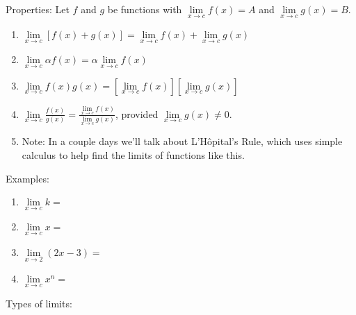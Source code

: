 \documentclass[]{book}
\theoremstyle{definition}
\theoremstyle{definition}
\theoremstyle{definition}
\theoremstyle{remark}
\begin{document}
Properties: Let \(f\) and \(g\) be functions with
\(\lim\limits_{x \to c} f(x)=A\) and \(\lim\limits_{x \to c} g(x)=B\).

\begin{enumerate}
        \item $\lim\limits_{x \to c}[f(x)+g(x)]=\lim\limits_{x \to c} f(x)+ \lim\limits_{x \to c} g(x)$
        \item $\lim\limits_{x \to c} \alpha f(x) = \alpha \lim\limits_{x \to c} f(x)$
        \item $\lim\limits_{x \to c} f(x) g(x) = [\lim\limits_{x \to c} f(x)][\lim\limits_{x \to c} g(x)]$
        \item $\lim\limits_{x \to c} \frac{f(x)}{g(x)} = \frac{\lim\limits_{x \to c} f(x)}{\lim\limits_{x \to c} g(x)}$, provided $\lim\limits_{x \to c} g(x)\ne 0$.
            \item Note: In a couple days we'll talk about L'H\^opital's Rule, which uses simple calculus to help find the limits of functions like this.
\end{enumerate}

Examples:

\begin{enumerate}
\item $\lim\limits_{x \to c} k =$
\item $\lim\limits_{x \to c} x =$

\begin{comment}
        \item \parbox[t]{3.75in}{$\lim\limits_{x\to 0} |x| =$} \parbox[t]{1in}{\,{\texttt{[image: abs.eps]}}} %
        \item \parbox[t]{3.75in}{$\lim\limits_{x\to 0} \left(1+\frac{1}{x^2}\right)=$} \parbox[t]{1in}{\,  {\texttt{[image: 1p1ovrx2.eps]}}} %
\end{comment}
        
\item $\lim\limits_{x\to 2} (2x-3) =$ %
\item $\lim\limits_{x \to c} x^n = $ %
\end{enumerate}

Types of limits:
\end{document}
